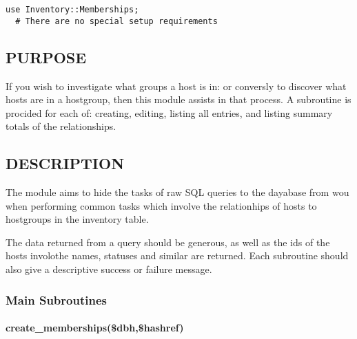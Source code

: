 \documentclass{book}
\begin{document}
\begin{Verbatim}[fontfamily=courier,gobble=1,frame=lines,fontsize=\small]
  use Inventory::Memberships;
  # There are no special setup requirements
\end{Verbatim}


\subsection{PURPOSE}
\label{Inventory::Memberships_PURPOSE}
\hypertarget{Inventory::Memberships_PURPOSE}{}



If you wish to investigate what groups a host is in: or conversly to discover what hosts are in a hostgroup, then this module assists in that process. A subroutine is procided for each of: creating, editing, listing all entries, and listing summary totals of the relationships.


\subsection{DESCRIPTION}
\label{Inventory::Memberships_DESCRIPTION}
\hypertarget{Inventory::Memberships_DESCRIPTION}{}



The module aims to hide the tasks of raw SQL queries to the dayabase from wou when performing common tasks which involve the relationhips of hosts to hostgroups in the inventory table.



The data returned from a query should be generous, as well as the ids of the hosts involothe names, statuses and similar are returned. Each subroutine should also give a descriptive success or failure message.


\subsubsection{Main Subroutines}
\label{Inventory::Memberships_Main_Subroutines}
\hypertarget{Inventory::Memberships_Main_Subroutines}{}


\paragraph*{create\protect\_memberships(\$dbh,\$hashref)}
\label{Inventory::Memberships_create_memberships_dbh_hashref_}
\hypertarget{Inventory::Memberships_create_memberships_dbh_hashref_}{}
\end{document}
